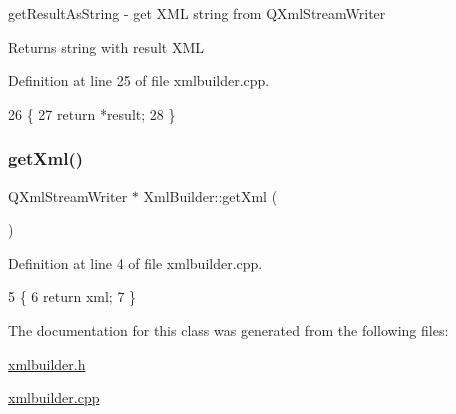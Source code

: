 get\+Result\+As\+String -\/ get X\+ML string from Q\+Xml\+Stream\+Writer 

\begin{DoxyReturn}{Returns}
string with result X\+ML 
\end{DoxyReturn}


Definition at line 25 of file xmlbuilder.\+cpp.


\begin{DoxyCode}
26 \{
27     \textcolor{keywordflow}{return} *result;
28 \}
\end{DoxyCode}
\mbox{\label{class_xml_builder_ac30c219c08203e1a18e38e7e43c3252e}} 
\subsubsection{\texorpdfstring{get\+Xml()}{getXml()}}
{\footnotesize\ttfamily Q\+Xml\+Stream\+Writer $\ast$ Xml\+Builder\+::get\+Xml (\begin{DoxyParamCaption}{ }\end{DoxyParamCaption})}



Definition at line 4 of file xmlbuilder.\+cpp.


\begin{DoxyCode}
5 \{
6     \textcolor{keywordflow}{return} xml;
7 \}
\end{DoxyCode}


The documentation for this class was generated from the following files\+:\begin{DoxyCompactItemize}
\item 
\hyperlink{xmlbuilder_8h}{xmlbuilder.\+h}\item 
\hyperlink{xmlbuilder_8cpp}{xmlbuilder.\+cpp}\end{DoxyCompactItemize}
